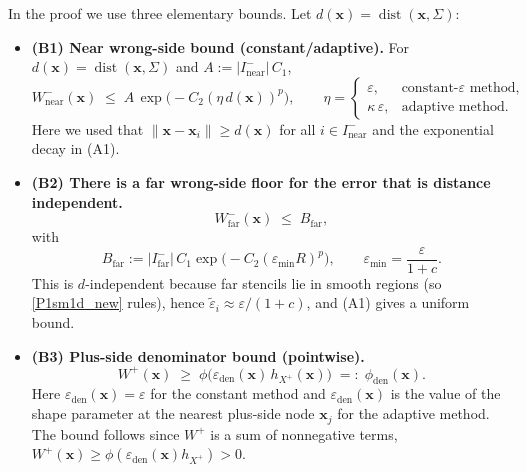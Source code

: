 \documentclass[preprint]{elsarticle}       %
\begin{document}
In the proof we use three elementary bounds. Let $d(\mathbf{x})=\operatorname{dist}(\mathbf{x},\Sigma)$:
\begin{itemize}
  \item \textbf{(B1) Near wrong-side bound (constant/adaptive).}
  For $d(\mathbf{x})=\operatorname{dist}(\mathbf{x},\Sigma)$ and $A:=|I^{-}_{\mathrm{near}}|\,C_1$,
  \begin{equation}\label{eq:B1}
    W^{-}_{\mathrm{near}}(\mathbf{x})
    \;\le\; A\,\exp\!\big(-C_2(\eta\, d(\mathbf{x}))^p\big),
    \qquad
    \eta=
    \begin{cases}
      \varepsilon, & \text{constant-}\varepsilon \text{ method},\\[1mm]
      \kappa\,\varepsilon, & \text{adaptive method}.
    \end{cases}
  \end{equation}
  Here we used that $\|\mathbf{x}-\mathbf{x}_i\|\ge d(\mathbf{x})$ for all $i\in I^{-}_{\mathrm{near}}$ and the exponential decay in (A1).

  \item \textbf{(B2) There is a far wrong-side floor for the error that is distance independent.}
  \begin{equation}\label{eq:B2}
    W^{-}_{\mathrm{far}}(\mathbf{x}) \;\le\; B_{\mathrm{far}},
  \end{equation}
  with 
  \[
B_{\mathrm{far}}
:= |I^{-}_{\mathrm{far}}|\,
C_1 \exp\!\bigl(- C_2 (\varepsilon_{\min} R)^{p} \bigr),
\qquad
\varepsilon_{\min}=\frac{\varepsilon}{1+c}.
\]
  This is $d$-independent because far stencils lie in smooth regions (so \ref{P1sm1d_new} rules), hence
  $\tilde\varepsilon_i\approx \varepsilon/(1+c)$, and (A1) gives a uniform bound.

  \item \textbf{(B3) Plus-side denominator bound (pointwise).}
  \begin{equation}\label{eq:B3}
    W^{+}(\mathbf{x})
    \;\ge\; \phi\!\bigl(\varepsilon_{\mathrm{den}}(\mathbf{x})\,h_{X^{+}}(\mathbf{x})\bigr)
    \;=:\; \phi_{\mathrm{den}}(\mathbf{x}).
  \end{equation}
  Here $\varepsilon_{\mathrm{den}}(\mathbf{x})=\varepsilon$ for the constant method and
  $\varepsilon_{\mathrm{den}}(\mathbf{x})$ is the value of the shape parameter at the nearest plus-side node $\mathbf{x}_j$
  for the adaptive method. 
The bound follows since $W^{+}$ is a sum of
nonnegative terms, $W^{+}(\mathbf{x})\ge \phi(\varepsilon_{\mathrm{den}}(\mathbf{x}) h_{X^{+}})>0$.
\end{itemize}
\end{document}
